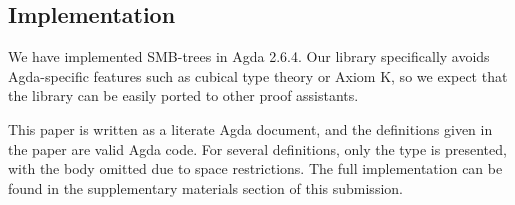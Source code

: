 \subsection{Implementation}

We have implemented SMB-trees in Agda 2.6.4.
Our library specifically avoids Agda-specific features
such as cubical type theory or Axiom K, so we expect
that the library can be easily ported to other proof assistants.

This paper is written as a literate Agda document, and the definitions
given in the paper are valid Agda code.
For several definitions, only the type is presented, with the body omitted due to
space restrictions. The full implementation can be found in the supplementary
materials section of this submission.
